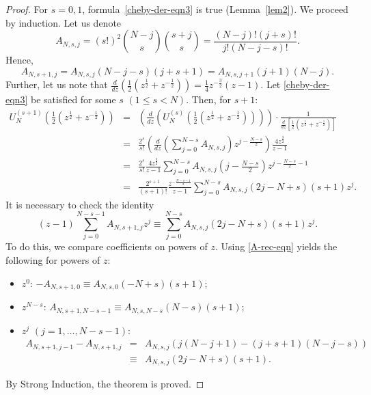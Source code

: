 \documentclass[10pt,a4paper]{amsart}
\newcommand{\br}[1]{\left[#1\right]}
\newcommand{\pa}[1]{\left(#1\right)}
\begin{document}
\begin{proof}
For $s = 0,1$, formula~\eqref{cheby-der-eqn3} is true (Lemma~\ref{lem2}). We proceed by induction. Let us denote
\begin{displaymath}
A_{N,s,j} =(s!)^2{N-j\choose s}{s+j\choose s}= \frac{(N - j)!(j + s)!}{j!(N - j - s)!}.
\end{displaymath}
Hence,
\begin{equation}\label{A-rec-eqn}
A_{N,s + 1,j} = A_{N,s,j}(N - j - s)(j + s + 1) = A_{N,s,j + 1}(j + 1)(N - j).
\end{equation}
Further, let us note that
$\displaystyle \frac{d}{dz}\pa{\frac{1}{2}\pa{z^{\frac{1}{2}} + z^{-\frac{1}{2}}}} = \frac{1}{4}z^{-\frac{3}{2}}(z - 1)$. Let \eqref{cheby-der-eqn3} be satisfied for some $s$ $\pa{1 \leq s < N}$. Then, for $s + 1$:
\begin{eqnarray*}
U_N^{(s + 1)}\pa{\frac{1}{2}\pa{z^{\frac{1}{2}} + z^{-\frac{1}{2}}}} 
&=& \pa{\frac{d}{dz}\pa{U_N^{(s)}\pa{\frac{1}{2}\pa{z^{\frac{1}{2}} + z^{-\frac{1}{2}}}}}} \cdot \frac{1}{\frac{d}{dz}\br{\frac{1}{2}\pa{z^{\frac{1}{2}} + z^{-\frac{1}{2}}}}}\\
&=& \frac{2^s}{s!}\pa{\frac{d}{dz}\pa{\sum_{j = 0}^{N - s}A_{N,s,j}}z^{j - \frac{N - s}{2}}}\frac{4z^{\frac{3}{2}}}{z - 1} \\
&=& \frac{2^s}{s!}\frac{4z^{\frac{3}{2}}}{z - 1}\sum_{j = 0}^{N-s}A_{N,s,j}\pa{j - \frac{N-s}{2}}z^{j - \frac{N - s}{2} - 1} \\
&=& \frac{2^{s + 1}}{(s + 1)!}\frac{z^{-\frac{N-s-1}{2}}}{z - 1}\sum_{j = 0}^{N-s}A_{N,s,j}(2j - N + s)(s + 1)z^j.
\end{eqnarray*}
It is necessary to check the identity
\begin{displaymath}
(z - 1)\sum_{j = 0}^{N - s - 1}A_{N,s + 1,j}z^j \equiv \sum_{j = 0}^{N - s}A_{N,s,j}(2j - N + s)(s + 1)z^j.
\end{displaymath}
To do this, we compare coefficients on powers of $z$. Using \eqref{A-rec-eqn} yields the following for powers of $z$:
\begin{itemize}
\item $z^0$: $-A_{N,s + 1,0} \equiv A_{N,s,0}(-N + s)(s + 1)$;
\item $z^{N - s}$: $A_{N,s + 1,N - s - 1} \equiv A_{N,s,N - s}(N - s)(s + 1)$;
\item $z^j$ $\pa{j = 1, \ldots, N - s - 1}$:
\begin{eqnarray*}
A_{N,s + 1,j - 1} - A_{N,s + 1,j} &=& A_{N,s,j}(j(N - j + 1) - (j + s + 1)(N - j - s)) \\
&\equiv& A_{N,s,j}(2j - N + s)(s + 1).
\end{eqnarray*}
\end{itemize}
By Strong Induction, the theorem is proved.
\end{proof}
\end{document}
